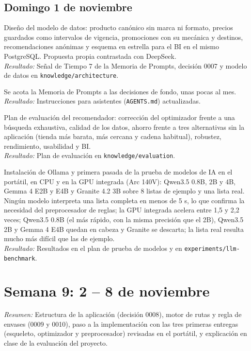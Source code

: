 \documentclass[11pt,a4paper]{article}
\newcommand{\actividad}[3]{\item[\textbf{[#1]}] #2 \\ \textit{Resultado:} #3}
\begin{document}
	\subsection*{Domingo 1 de noviembre}
	\begin{description}[leftmargin=0pt, itemsep=6pt]
		\actividad{Decisión}{Diseño del modelo de datos: producto canónico sin marca ni formato, precios guardados como intervalos de vigencia, promociones con su mecánica y destinos, recomendaciones anónimas y esquema en estrella para el BI en el mismo PostgreSQL. Propuesta propia contrastada con DeepSeek.}{Señal de Tiempo 7 de la Memoria de Prompts, decisión 0007 y modelo de datos en \texttt{knowledge/architecture}.}
		\actividad{Tarea}{Se acota la Memoria de Prompts a las decisiones de fondo, unas pocas al mes.}{Instrucciones para asistentes (\texttt{AGENTS.md}) actualizadas.}
		\actividad{Análisis}{Plan de evaluación del recomendador: corrección del optimizador frente a una búsqueda exhaustiva, calidad de los datos, ahorro frente a tres alternativas sin la aplicación (tienda más barata, más cercana y cadena habitual), robustez, rendimiento, usabilidad y BI.}{Plan de evaluación en \texttt{knowledge/evaluation}.}
		\actividad{Tarea}{Instalación de Ollama y primera pasada de la prueba de modelos de IA en el portátil, en CPU y en la GPU integrada (Arc 140V): Qwen3.5 0.8B, 2B y 4B, Gemma 4 E2B y E4B y Granite 4.2 3B sobre 8 listas de ejemplo y una lista real. Ningún modelo interpreta una lista completa en menos de 5 s, lo que confirma la necesidad del preprocesador de reglas; la GPU integrada acelera entre 1,5 y 2,2 veces; Qwen3.5 0.8B (el más rápido, con la misma precisión que el 2B), Qwen3.5 2B y Gemma 4 E4B quedan en cabeza y Granite se descarta; la lista real resulta mucho más difícil que las de ejemplo.}{Resultados en el plan de prueba de modelos y en \texttt{experiments/llm-benchmark}.}
	\end{description}

	\section*{Semana 9: 2 -- 8 de noviembre}
	\textit{Resumen:} Estructura de la aplicación (decisión 0008), motor de rutas y regla de envases (0009 y 0010), paso a la implementación con las tres primeras entregas (esqueleto, optimizador y preprocesador) revisadas en el portátil, y explicación en clase de la evaluación del proyecto.
\end{document}
